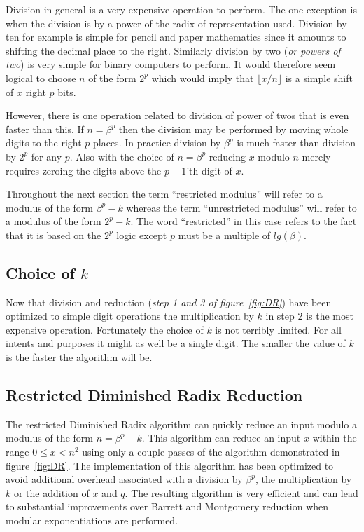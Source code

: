 \documentclass[b5paper]{book}
\begin{document}
Division in general is a very expensive operation to perform.  The one exception is when the division is by a power of the radix of representation used.  
Division by ten for example is simple for pencil and paper mathematics since it amounts to shifting the decimal place to the right.  Similarly division 
by two (\textit{or powers of two}) is very simple for binary computers to perform.  It would therefore seem logical to choose $n$ of the form $2^p$ 
which would imply that $\lfloor x / n \rfloor$ is a simple shift of $x$ right $p$ bits.  

However, there is one operation related to division of power of twos that is even faster than this.  If $n = \beta^p$ then the division may be 
performed by moving whole digits to the right $p$ places.  In practice division by $\beta^p$ is much faster than division by $2^p$ for any $p$.  
Also with the choice of $n = \beta^p$ reducing $x$ modulo $n$ merely requires zeroing the digits above the $p-1$'th digit of $x$.  

Throughout the next section the term ``restricted modulus'' will refer to a modulus of the form $\beta^p - k$ whereas the term ``unrestricted
modulus'' will refer to a modulus of the form $2^p - k$.  The word ``restricted'' in this case refers to the fact that it is based on the 
$2^p$ logic except $p$ must be a multiple of $lg(\beta)$.  

\subsection{Choice of $k$}
Now that division and reduction (\textit{step 1 and 3 of figure~\ref{fig:DR}}) have been optimized to simple digit operations the multiplication by $k$
in step 2 is the most expensive operation.  Fortunately the choice of $k$ is not terribly limited.  For all intents and purposes it might
as well be a single digit.  The smaller the value of $k$ is the faster the algorithm will be.  

\subsection{Restricted Diminished Radix Reduction}
The restricted Diminished Radix algorithm can quickly reduce an input modulo a modulus of the form $n = \beta^p - k$.  This algorithm can reduce 
an input $x$ within the range $0 \le x < n^2$ using only a couple passes of the algorithm demonstrated in figure~\ref{fig:DR}.  The implementation
of this algorithm has been optimized to avoid additional overhead associated with a division by $\beta^p$, the multiplication by $k$ or the addition 
of $x$ and $q$.  The resulting algorithm is very efficient and can lead to substantial improvements over Barrett and Montgomery reduction when modular 
exponentiations are performed.
\end{document}
